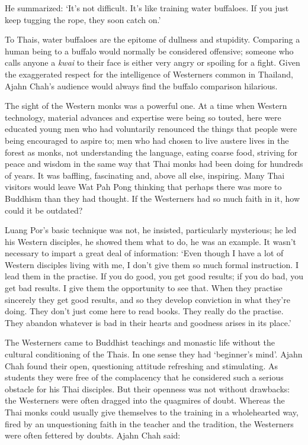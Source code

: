 He summarized: `It's not difficult. It's like training water buffaloes. 
If you just keep tugging the rope, they soon catch on.'

To Thais, water buffaloes are the epitome of dullness and stupidity. 
Comparing a human being to a buffalo would normally be considered
offensive; someone who calls anyone a \emph{kwai} to their face is
either very angry or spoiling for a fight. Given the exaggerated respect
for the intelligence of Westerners common in Thailand, Ajahn Chah's
audience would always find the buffalo comparison hilarious. 

The sight of the Western monks was a powerful one. At a time when
Western technology, material advances and expertise were being so
touted, here were educated young men who had voluntarily renounced the
things that people were being encouraged to aspire to; men who had
chosen to live austere lives in the forest as monks, not understanding
the language, eating coarse food, striving for peace and wisdom in the
same way that Thai monks had been doing for hundreds of years. It was
baffling, fascinating and, above all else, inspiring. Many Thai visitors
would leave Wat Pah Pong thinking that perhaps there was more to
Buddhism than they had thought. If the Westerners had so much faith in
it, how could it be outdated? 

Luang Por's basic technique was not, he insisted, particularly
mysterious; he led his Western disciples, he showed them what to do, he
was an example. It wasn't necessary to impart a great deal of
information: `Even though I have a lot of Western disciples living with
me, I don't give them so much formal instruction. I lead them in the
practise. If you do good, you get good results; if you do bad, you get
bad results. I give them the opportunity to see that. When they practise
sincerely they get good results, and so they develop conviction in what
they're doing. They don't just come here to read books. They really do
the practise. They abandon whatever is bad in their hearts and goodness
arises in its place.'

The Westerners came to Buddhist teachings and monastic life without the
cultural conditioning of the Thais. In one sense they had `beginner's
mind'. Ajahn Chah found their open, questioning attitude refreshing and
stimulating. As students they were free of the complacency that he
considered such a serious obstacle for his Thai disciples. But their
openness was not without drawbacks: the Westerners were often dragged
into the quagmires of doubt. Whereas the Thai monks could usually give
themselves to the training in a wholehearted way, fired by an
unquestioning faith in the teacher and the tradition, the Westerners
were often fettered by doubts. Ajahn Chah said: 

